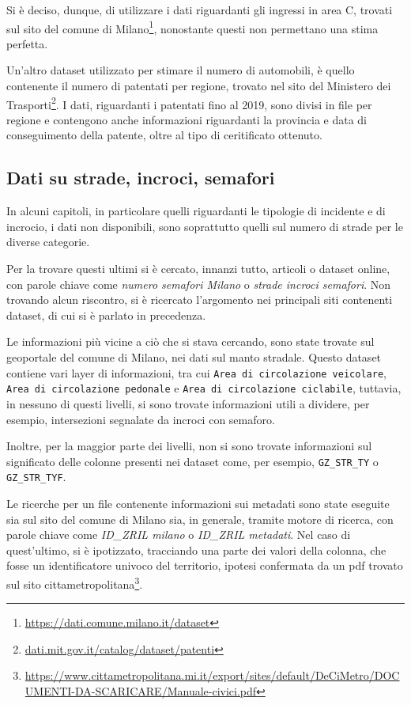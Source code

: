 \documentclass[a4paper,12pt]{report}
\newcommand{\columnstyle}[1]{\texttt{#1}}
\newcommand{\quotestyle}[1]{\textit{#1}}
\begin{document}
Si è deciso, dunque, di utilizzare i dati riguardanti gli ingressi in area C, 
trovati sul sito del comune di Milano\footnote{\url{https://dati.comune.milano.it/dataset}}, 
nonostante questi non permettano una stima perfetta.

Un'altro dataset utilizzato per stimare il numero di automobili, è quello contenente 
il numero di patentati per regione, trovato nel sito del Ministero dei 
Trasporti\footnote{\url{dati.mit.gov.it/catalog/dataset/patenti}}.
I dati, riguardanti i patentati fino al 2019, sono divisi in file per regione e 
contengono anche informazioni riguardanti la provincia e data di conseguimento della 
patente, oltre al tipo di ceritificato ottenuto.

\subsection{Dati su strade, incroci, semafori}

In alcuni capitoli, in particolare quelli riguardanti le tipologie di incidente e 
di incrocio, i dati non disponibili, sono soprattutto quelli sul 
numero di strade per le diverse categorie.

Per la trovare questi ultimi si è cercato, innanzi tutto, articoli o dataset online, con 
parole chiave come \quotestyle{numero semafori Milano} o \quotestyle{strade incroci semafori}.
Non trovando alcun riscontro, si è ricercato l'argomento nei principali siti contenenti 
dataset, di cui si è parlato in precedenza. 

Le informazioni più vicine a ciò che si stava cercando, sono state trovate sul geoportale 
del comune di Milano, nei dati sul manto stradale.
Questo dataset contiene vari layer di informazioni, tra cui 
\columnstyle{Area di circolazione veicolare}, 
\columnstyle{Area di circolazione pedonale} e \columnstyle{Area di circolazione ciclabile}, 
tuttavia, in nessuno di questi livelli, si sono trovate informazioni utili a dividere, 
per esempio, intersezioni segnalate da incroci con semaforo. 

Inoltre, per la maggior parte dei livelli, non si sono trovate informazioni sul significato 
delle colonne presenti nei dataset come, per esempio, \columnstyle{GZ\_STR\_TY} o 
\columnstyle{GZ\_STR\_TYF}. 

Le ricerche per un file contenente informazioni sui metadati sono state eseguite sia 
sul sito del comune di Milano sia, in generale, tramite motore di ricerca, con parole chiave 
come \quotestyle{ID\_ZRIL milano} o \quotestyle{ID\_ZRIL metadati}. 
Nel caso di quest'ultimo, si è ipotizzato, tracciando una parte dei valori della colonna, 
che fosse un identificatore univoco del territorio, ipotesi confermata da un pdf trovato sul sito 
cittametropolitana\footnote{\url{https://www.cittametropolitana.mi.it/export/sites/default/DeCiMetro/DOCUMENTI-DA-SCARICARE/Manuale-civici.pdf}}. 
\end{document}
